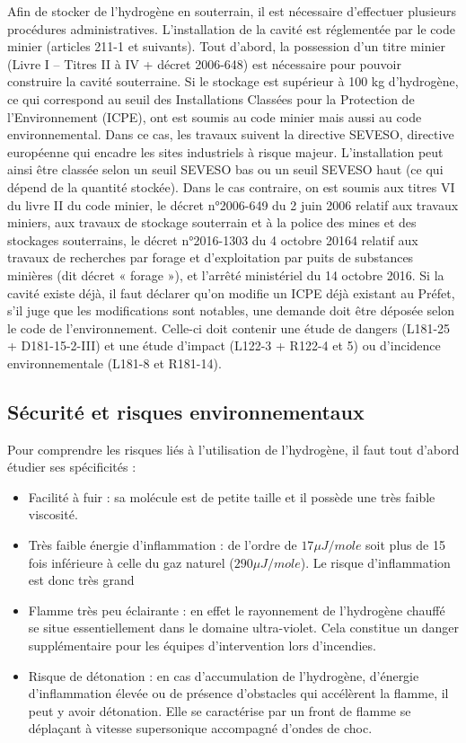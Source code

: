 \documentclass[11pt,french,a4paper]{article}
\begin{document}
Afin de stocker de l’hydrogène en souterrain, il est nécessaire d’effectuer plusieurs procédures administratives. L’installation de la cavité est réglementée par le code minier (articles 211-1 et suivants).
Tout d’abord, la possession d’un titre minier (Livre I – Titres II à IV + décret 2006-648) est nécessaire pour pouvoir construire la cavité souterraine. Si le stockage est supérieur à 100 kg d’hydrogène, ce qui correspond au seuil des Installations Classées pour la Protection de l’Environnement (ICPE), ont est soumis au code minier mais aussi au code environnemental. Dans ce cas, les travaux suivent la directive SEVESO, directive européenne qui encadre les sites industriels à risque majeur. 
L’installation peut ainsi être classée selon un seuil SEVESO bas ou un seuil SEVESO haut (ce qui dépend de la quantité stockée). Dans le cas contraire, on est soumis aux titres VI du livre II du code minier, le décret n°2006-649 du 2 juin 2006 relatif aux travaux miniers, aux travaux de stockage souterrain et à la police des mines et des stockages souterrains, le décret n°2016-1303 du 4 octobre 20164 relatif aux travaux de recherches par forage et d’exploitation par puits de substances minières (dit décret « forage »), et l’arrêté ministériel du 14 octobre 2016. Si la cavité existe déjà, il faut déclarer qu’on modifie un ICPE déjà existant au Préfet, s’il juge que les modifications sont notables, une demande doit être déposée selon le code de l’environnement. Celle-ci doit contenir une étude de dangers (L181-25 + D181-15-2-III) et une étude d’impact (L122-3 + R122-4 et 5) ou d’incidence environnementale (L181-8 et R181-14).


\subsection{Sécurité et risques environnementaux}

Pour comprendre les risques liés à l'utilisation de l'hydrogène, il faut tout d'abord étudier ses spécificités :
\begin{itemize}
\item Facilité à fuir : sa molécule est de petite taille et il possède une très faible viscosité.
\item Très faible énergie d'inflammation : de l'ordre de $17 \mu J/mole$ soit plus de 15 fois inférieure à celle du gaz naturel ($290 \mu J/mole$). Le risque d'inflammation est donc très grand
\item Flamme très peu éclairante : en effet le rayonnement de l'hydrogène chauffé se situe essentiellement dans le domaine ultra-violet. Cela constitue un danger supplémentaire pour les équipes d'intervention lors d'incendies.
\item Risque de détonation : en cas d'accumulation de l'hydrogène, d'énergie d'inflammation élevée ou de présence d'obstacles qui accélèrent la flamme, il peut y avoir détonation. Elle se caractérise par un front de flamme se déplaçant à vitesse supersonique accompagné d'ondes de choc.
\end{itemize}
\end{document}
